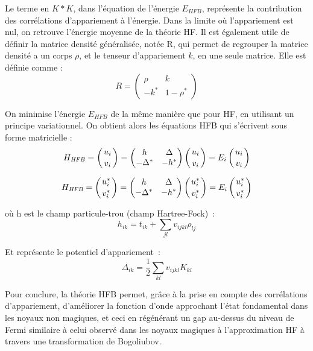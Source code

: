Le terme en $K*K$, dans l’équation de l’énergie $E_{HFB}$, représente la contribution des corrélations d’appariement à l’énergie. Dans la limite où l’appariement est nul, on retrouve l’énergie moyenne de la théorie HF.
Il est également utile de définir la matrice densité généralisée, notée R, qui permet de regrouper la matrice densité a un corps $\rho$, et le tenseur d’appariement $k$, en une seule matrice. Elle est définie comme :
\begin{equation}R=\left(\begin{matrix}\rho
&k\\-k^{\ast }&1-\rho ^{\ast
}\end{matrix}\right)\end{equation}


On minimise l’énergie $E_{HFB}$ de la même manière que pour HF, en utilisant un principe variationnel. On obtient alors les équations HFB qui s’écrivent sous forme matricielle :
\begin{equation}H_{\mathit{HFB}}=\left(\genfrac{}{}{0pt}{0}{u_i}{v_i}\right)=\left(\begin{matrix}h&{\Delta}\\-{\Delta}^{\ast
}&-h^{\ast
}\end{matrix}\right)\left(\genfrac{}{}{0pt}{0}{u_i}{v_i}\right)=E_i\left(\genfrac{}{}{0pt}{0}{u_i}{v_i}\right)\end{equation}


\begin{equation}H_{\mathit{HFB}}=\left(\genfrac{}{}{0pt}{0}{u_i^{\ast }}{v_i^{\ast
}}\right)=\left(\begin{matrix}h&{\Delta}\\-{\Delta}^{\ast }&-h^{\ast
}\end{matrix}\right)\left(\genfrac{}{}{0pt}{0}{u_i^{\ast }}{v_i^{\ast }}\right)=E_i\left(\genfrac{}{}{0pt}{0}{u_i^{\ast
}}{v_i^{\ast }}\right)\end{equation}


où h est le champ particule-trou (champ Hartree-Fock) :
\begin{equation}h_{\mathit{ik}}=t_{\mathit{ik}}+\sum _{\mathit{jl}}v_{\mathit{ijkl}}\rho
_{\mathit{lj}}\end{equation}


Et représente le potentiel d'appariement :
\begin{equation}{\Delta}_{\mathit{ik}}=\frac 1 2\sum
_{\mathit{kl}}v_{\mathit{ijkl}}K_{\mathit{kl}}\end{equation}


Pour conclure, la théorie HFB permet, grâce à la prise en compte des corrélations d’appariement, d’améliorer la fonction d’onde approchant l’état fondamental dans les noyaux non magiques, et ceci en régénérant un gap au-dessus du niveau de Fermi similaire à celui observé dans les noyaux magiques à l’approximation HF à travers une transformation de Bogoliubov.

